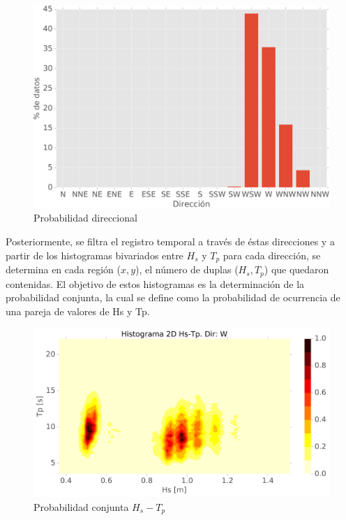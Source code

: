 \documentclass[5p,times,authoryear]{elsarticle}
\begin{document}
\begin{figure}[h]
    \centering
    \includegraphics[scale=0.35]{Graficas/histograma_direccional}
    \caption{Probabilidad direccional}
    \label{fig:7 Prob direccional}
\end{figure}

Posteriormente, se filtra el registro temporal a través de éstas direcciones y a partir de los histogramas bivariados entre $H_s$ y $T_p$ para cada dirección, se determina en cada región ($x,y$), el número de duplas ($H_s,T_p$) que quedaron contenidas. El objetivo de estos histogramas es la determinación de la probabilidad conjunta, la cual se define como la probabilidad de ocurrencia de una pareja de valores de Hs y Tp.

\begin{figure}[h]
    \centering
    \includegraphics[scale=0.28]{Graficas/Histograma2d_W}
    \caption{Probabilidad conjunta $H_s-T_p$}
    \label{fig:8 Prob conjunta}
\end{figure}
\end{document}
